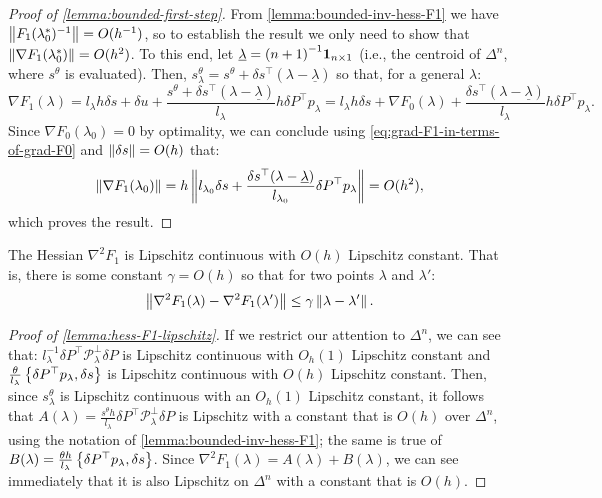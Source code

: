 \documentclass[eikonal.tex]{subfiles}
\begin{document}
\begin{proof}[Proof of \cref{lemma:bounded-first-step}]
  From \cref{lemma:bounded-inv-hess-F1} we have
  $\left\|F_1(\lambda_0^*)^{-1}\right\| = O(h^{-1})$, so to establish the
  result we only need to show that
  $\left\|\nabla F_1(\lambda_0^*)\right\| = O(h^2)$. To this end, let
  $\underline{\lambda} = {(n + 1)}^{-1} \boldsymbol{1}_{n \times 1}$ (i.e., the
  centroid of $\Delta^n$, where $s^\theta$ is evaluated). Then,
  $s^\theta_\lambda = s^\theta + \delta s^\top (\lambda -
  \underline{\lambda})$ so that, for a general $\lambda$:
  \begin{equation}
    \label{eq:grad-F1-in-terms-of-grad-F0}
    \nabla F_1(\lambda) = l_\lambda h \delta s + \delta u + \frac{s^\theta + \delta s^\top (\lambda - \underline{\lambda})}{l_\lambda} h \delta P^\top p_\lambda = l_\lambda h \delta s + \nabla F_0(\lambda) + \frac{\delta s^\top {(\lambda - \underline{\lambda})}}{l_\lambda} h \delta P^\top p_\lambda.
  \end{equation}
  Since $\nabla F_0(\lambda_0) = 0$ by optimality, we can conclude
  using \cref{eq:grad-F1-in-terms-of-grad-F0} and
  $\left\|\delta s\right\| = O(h)$ that:
  \begin{equation}
    \left\|\nabla F_1(\lambda_0)\right\| = h \left\|l_{\lambda_0} \delta s + \frac{\delta s^\top {(\lambda - \underline{\lambda})}}{l_{\lambda_0}} \delta P^\top p_\lambda\right\| = O(h^2),
  \end{equation}
  which proves the result.
\end{proof}

\begin{lemma}\label{lemma:hess-F1-lipschitz}
  The Hessian $\nabla^2 F_1$ is Lipschitz continuous with $O(h)$
  Lipschitz constant. That is, there is some constant $\gamma = O(h)$
  so that for two points $\lambda$ and $\lambda'$:
  \begin{align*}
    \left\|\nabla^2 F_1(\lambda) - \nabla^2 F_1(\lambda')\right\| \leq \gamma \left\|\lambda - \lambda'\right\|.
  \end{align*}
\end{lemma}

\begin{proof}[Proof of \cref{lemma:hess-F1-lipschitz}]
  If we restrict our attention to $\Delta^n$, we can see that:
  $l_\lambda^{-1} \delta P^\top \mathcal{P}_\lambda^\perp \delta P$ is
  Lipschitz continuous with $O_h(1)$ Lipschitz constant and
  $\tfrac{\theta}{l_\lambda} \left\{\delta P^\top p_\lambda, \delta
    s\right\}$ is Lipschitz continuous with $O(h)$ Lipschitz constant. Then,
  since $s^\theta_\lambda$ is Lipschitz continuous with an $O_h(1)$
  Lipschitz constant, it follows that
  $A(\lambda) = \tfrac{s^\theta h}{l_\lambda} \delta P^\top
  \mathcal{P}^\perp_\lambda \delta P$ is Lipschitz with a constant
  that is $O(h)$ over $\Delta^n$, using the notation of
  \cref{lemma:bounded-inv-hess-F1}; the same is true of
  $B(\lambda) = \tfrac{\theta h}{l_\lambda} \left\{\delta P^\top
    p_\lambda, \delta s\right\}$. Since
  $\nabla^2 F_1(\lambda) = A(\lambda) + B(\lambda)$, we can see
  immediately that it is also Lipschitz on $\Delta^n$ with a constant
  that is $O(h)$.
\end{proof}
\end{document}
